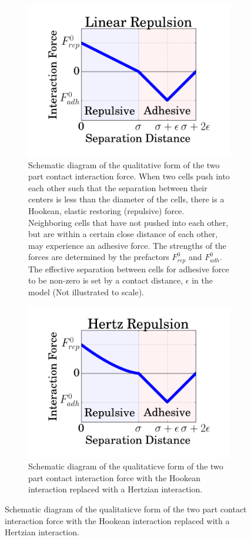 \documentclass[aps,prb,twocolumn,groupedaddress,nofootinbib,floatfix]{revtex4}
\begin{document}
\begin{figure}
  \begin{subfigure}{\columnwidth}
    \includegraphics[width=1.0\columnwidth]{images/interaction.png}
      \caption{Schematic diagram of the qualitative form of the two part contact interaction force. When two cells push into each other such that the separation between their centers is less than the diameter of the cells, there is a Hookean, elastic restoring (repulsive) force. Neighboring cells that have not pushed into each other, but are within a certain close distance of each other, may experience an adhesive force. The strengths of the forces are determined by the prefactors $F_{rep}^0$ and $F_{adh}^0$. The effective separation between cells for adhesive force to be non-zero is set by a contact distance, $\epsilon$  in the model (Not illustrated to scale).}
  \end{subfigure}
  \begin{subfigure}{\columnwidth}
    \includegraphics[width=1.0\columnwidth]{images/hertz.png}
    \caption{Schematic diagram of the qualitaticve form of the two part contact interaction force with the Hookean interaction replaced with a Hertzian interaction.}
  \end{subfigure}
  \label{fig:interaction}
\end{figure}
\end{document}
